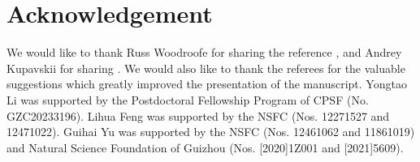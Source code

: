 \documentclass[11pt]{article}
\numberwithin{equation}{section}
\begin{document}

\section*{Acknowledgement} 
We would  like to thank Russ Woodroofe for sharing the reference \cite{BW2024}, and Andrey Kupavskii for sharing \cite{Kup2024}.  We would also like to thank the referees for the valuable suggestions which greatly improved the presentation of the manuscript.
 Yongtao Li was supported by the Postdoctoral Fellowship Program of CPSF (No. GZC20233196). Lihua Feng was supported by the NSFC (Nos. 12271527 and 12471022). Guihai Yu was supported by the NSFC (Nos. 12461062 and  11861019) and Natural Science Foundation of Guizhou (Nos. [2020]1Z001 and  [2021]5609). 
\end{document}
